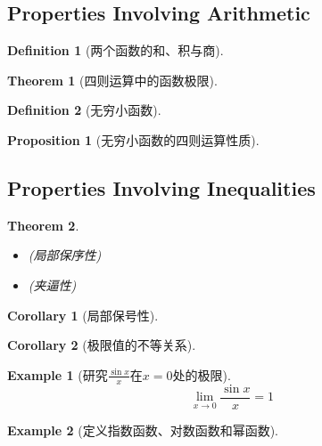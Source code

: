 \documentclass[onecolumn]{ctexart}
\newtheorem{definition}{Definition}
\newtheorem{theorem}{Theorem}
\newtheorem{proposition}{Proposition}
\newtheorem{corollary}{Corollary}
\newtheorem{example}{Example}
\begin{document}
\subsection{Properties Involving Arithmetic}

\begin{definition}[两个函数的和、积与商]
  
\end{definition}

\begin{theorem}[四则运算中的函数极限]
  
\end{theorem}

\begin{definition}[无穷小函数]
  
\end{definition}

\begin{proposition}[无穷小函数的四则运算性质]
  
\end{proposition}

\subsection{Properties Involving Inequalities}

\begin{theorem}
  \begin{itemize}
    \item (局部保序性)
    \item (夹逼性)
  \end{itemize}
\end{theorem}

\begin{corollary}[局部保号性]
  
\end{corollary}

\begin{corollary}[极限值的不等关系]
  
\end{corollary}

\begin{example}[研究$\frac{\sin x}{x}$在$x=0$处的极限]
  \begin{equation}
    \lim_{x \to 0} \frac{\sin x}{x} = 1
  \end{equation}
\end{example}

\begin{example}[定义指数函数、对数函数和幂函数]
  
\end{example}
\end{document}

